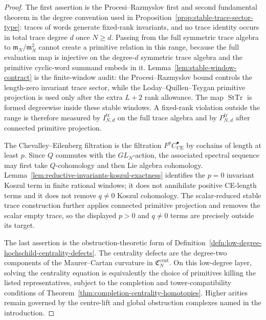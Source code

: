 \documentclass[11pt]{memoir}
\begin{document}
\begin{proof}
  The first assertion is the Procesi--Razmyslov first and second
  fundamental theorem in the degree convention used in
  Proposition~\ref{prop:stable-trace-sector-type}: traces of words
  generate fixed-rank invariants, and no trace identity occurs in total
  trace degree \(d\) once \(N\ge d\).  Passing from the full symmetric
  trace algebra to \(\mathfrak m_N/\mathfrak m_N^2\) cannot create a
  primitive relation in this range, because the full evaluation map is
  injective on the degree-\(d\) symmetric trace algebra and the
  primitive cyclic-word summand embeds in it.
  Lemma~\ref{lem:stable-window-contract} is the finite-window audit:
  the Procesi--Razmyslov bound controls the length-zero invariant trace
  sector, while the
  Loday--Quillen--Tsygan primitive projection is used only after the
  extra \(L+2\) rank allowance.  The map \(\operatorname{StTr}\) is
  formed degreewise inside these stable windows.  A fixed-rank
  violation outside the range is therefore measured by
  \(I^{\mathrm{tr}}_{N,d}\) on the full trace algebra and by
  \(P^{\mathrm{tr}}_{N,d}\) after connected primitive projection.

  The Chevalley--Eilenberg filtration is the filtration
  \(F^pC^\bullet_{\mathrm{CE}}\) by cochains of length at least \(p\).
  Since \(Q\) commutes with the \(GL_N\)-action, the
  associated spectral sequence may first take \(Q\)-cohomology and then
  Lie algebra cohomology.  Lemma~\ref{lem:reductive-invariants-koszul-exactness}
  identifies the \(p=0\) invariant Koszul term in finite rational
  windows; it does not annihilate positive CE-length terms and it does
  not remove \(q\ne0\) Koszul cohomology.  The scalar-reduced stable
  trace construction further applies connected primitive projection and
  removes the scalar empty trace, so the displayed \(p>0\) and
  \(q\ne0\) terms are precisely outside its target.

  The last assertion is the obstruction-theoretic form of
  Definition~\ref{defn:low-degree-hochschild-centrality-defects}.  The
  centrality defects are the degree-two components of the Maurer--Cartan
  curvature in \(\mathfrak C^{\mathrm{cent}}_N\).  On this low-degree
  layer, solving the centrality equation is equivalently the choice of
  primitives killing the listed representatives, subject to the
  completion and tower-compatibility conditions of
  Theorem~\ref{thm:completion-centrality-homotopies}.  Higher arities
  remain governed by the centre-lift and global obstruction complexes
  named in the introduction.
\end{proof}
\end{document}
